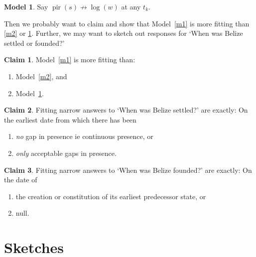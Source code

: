 \documentclass{amsart}
\DeclareMathOperator{\pir}{pir}%
\theoremstyle{definition}%
\newtheorem{model}{Model}
\theoremstyle{definition}%
\newtheorem{claim}{Claim}
\begin{document}
%
%
\begin{model}
\label{m3}
Say \(\pir(s)\not\to\log(w)\) at any \(t_{k}\). %
\end{model}
%
%
Then we probably want to claim and show that Model~\ref{m1} is more fitting than \ref{m2} or \ref{m3}. %
Further, we may want to sketch out responses for `When was Belize settled or founded?'%
%
%
\begin{claim}
\label{c1}
Model~\ref{m1} is more fitting than: 
\begin{enumerate}[1.]%
\item Model~\ref{m2}, and 
\item Model~\ref{m3}.
\end{enumerate}
\end{claim}
%
%
\begin{claim}
\label{c2}
Fitting narrow answers to `When was Belize settled?' are exactly: On the earliest date from which there has been%
\begin{enumerate}[1.]
\item \emph{no} gap in presence ie continuous presence, or%
\item \emph{only} acceptable gaps in presence.%
\end{enumerate}
\end{claim}
%
%
\begin{claim}
\label{c3}
Fitting narrow answers to `When was Belize founded?' are exactly: On the date of
\begin{enumerate}[1.]
\item the creation or constitution of its earliest predecessor state, or%
\item null.
\end{enumerate}
\end{claim}
%
%
%
%
\section{Sketches}
\label{s:sketches}
\end{document}

